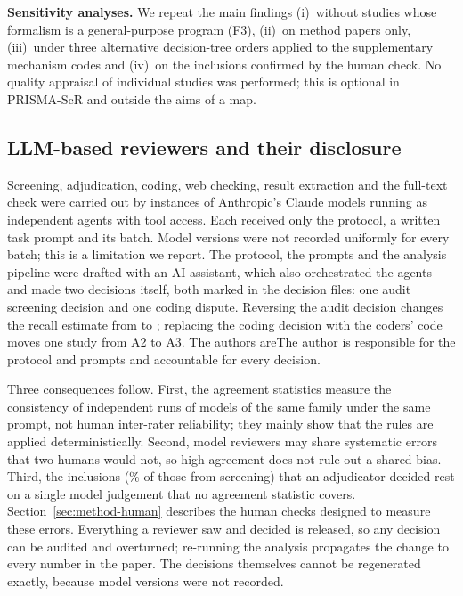 \textbf{Sensitivity analyses.} We repeat the main findings (i)~without studies whose formalism is a general-purpose program (F3), (ii)~on method papers only, (iii)~under three alternative decision-tree orders applied to the supplementary mechanism codes and (iv)~on the inclusions confirmed by the human check. No quality appraisal of individual studies was performed; this is optional in PRISMA-ScR and outside the aims of a map.

\subsection{LLM-based reviewers and their disclosure}
\label{sec:method-ai}
Screening, adjudication, coding, web checking, result extraction and the full-text check were carried out by instances of Anthropic's Claude models running as independent agents with tool access. Each received only the protocol, a written task prompt and its batch. Model versions were not recorded uniformly for every batch; this is a limitation we report. The protocol, the prompts and the analysis pipeline were drafted with an AI assistant, which also orchestrated the agents and made two decisions itself, both marked in the decision files: one audit screening decision and one coding dispute. Reversing the audit decision changes the recall estimate from  to ; replacing the coding decision with the coders' code moves one study from A2 to A3. \ifanonymous The authors are\else The author is\fi{} responsible for the protocol and prompts and accountable for every decision.

Three consequences follow. First, the agreement statistics measure the consistency of independent runs of models of the same family under the same prompt, not human inter-rater reliability; they mainly show that the rules are applied deterministically. Second, model reviewers may share systematic errors that two humans would not, so high agreement does not rule out a shared bias. Third, the  inclusions (\% of those from screening) that an adjudicator decided rest on a single model judgement that no agreement statistic covers. Section~\ref{sec:method-human} describes the human checks designed to measure these errors. Everything a reviewer saw and decided is released, so any decision can be audited and overturned; re-running the analysis propagates the change to every number in the paper. The decisions themselves cannot be regenerated exactly, because model versions were not recorded.

